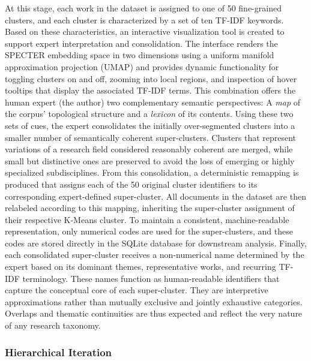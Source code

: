 \documentclass{article}
\begin{document}
	At this stage, each work in the dataset is assigned to one of 50 fine-grained clusters, and each cluster is characterized by a set of ten TF-IDF keywords. Based on these characteristics, an interactive visualization tool is created to support expert interpretation and consolidation. The interface renders the SPECTER embedding space in two dimensions using a uniform manifold approximation projection (UMAP) and provides dynamic functionality for toggling clusters on and off, zooming into local regions, and inspection of hover tooltips that display the associated TF-IDF terms. This combination offers the human expert (the author) two complementary semantic perspectives: A \textit{map} of the corpus' topological structure and a \textit{lexicon} of its contents. Using these two sets of cues, the expert consolidates the initially over-segmented clusters into a smaller number of semantically coherent super-clusters. Clusters that represent variations of a research field considered reasonably coherent are merged, while small but distinctive ones are preserved to avoid the loss of emerging or highly specialized subdisciplines. From this consolidation, a deterministic remapping is produced that assigns each of the 50 original cluster identifiers to its corresponding expert-defined super-cluster. All documents in the dataset are then relabeled according to this mapping, inheriting the super-cluster assignment of their respective K-Means cluster. To maintain a consistent, machine-readable representation, only numerical codes are used for the super-clusters, and these codes are stored directly in the SQLite database for downstream analysis. Finally, each consolidated super-cluster receives a non-numerical name determined by the expert based on its dominant themes, representative works, and recurring TF-IDF terminology. These names function as human-readable identifiers that capture the conceptual core of each super-cluster. They are interpretive approximations rather than mutually exclusive and jointly exhaustive categories. Overlaps and thematic continuities are thus expected and reflect the very nature of any research taxonomy.
	
	
	\subsubsection{Hierarchical Iteration}
	
\end{document}
